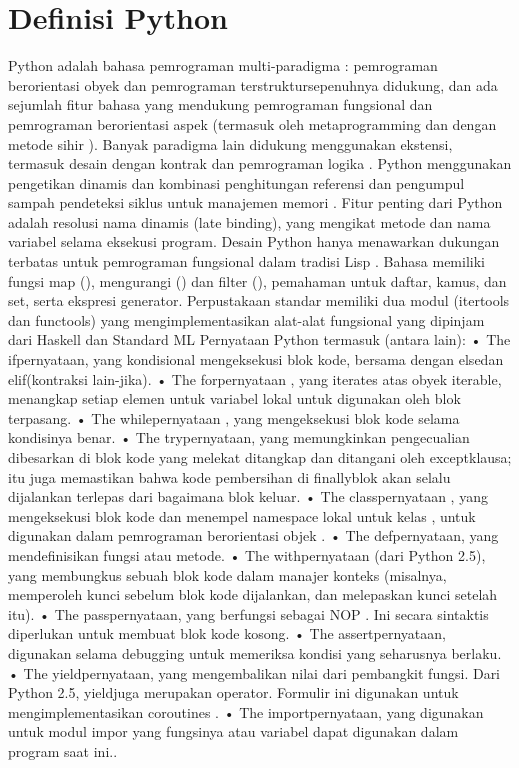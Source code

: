 \section{Definisi Python}
Python adalah bahasa pemrograman multi-paradigma : pemrograman berorientasi obyek dan pemrograman terstruktursepenuhnya didukung, dan ada sejumlah fitur bahasa yang mendukung pemrograman fungsional dan pemrograman berorientasi aspek (termasuk oleh metaprogramming dan dengan metode sihir ).  Banyak paradigma lain didukung menggunakan ekstensi, termasuk desain dengan kontrak  dan pemrograman logika .
Python menggunakan pengetikan dinamis dan kombinasi penghitungan referensi dan pengumpul sampah pendeteksi siklus untuk manajemen memori . Fitur penting dari Python adalah resolusi nama dinamis (late binding), yang mengikat metode dan nama variabel selama eksekusi program.
Desain Python hanya menawarkan dukungan terbatas untuk pemrograman fungsional dalam tradisi Lisp . Bahasa memiliki fungsi map (), mengurangi () dan filter (), pemahaman untuk daftar, kamus, dan set, serta ekspresi generator. Perpustakaan standar memiliki dua modul (itertools dan functools) yang mengimplementasikan alat-alat fungsional yang dipinjam dari Haskell dan Standard ML 
Pernyataan Python termasuk (antara lain):
•	The ifpernyataan, yang kondisional mengeksekusi blok kode, bersama dengan elsedan elif(kontraksi lain-jika).
•	The forpernyataan , yang iterates atas obyek iterable, menangkap setiap elemen untuk variabel lokal untuk digunakan oleh blok terpasang.
•	The whilepernyataan , yang mengeksekusi blok kode selama kondisinya benar.
•	The trypernyataan, yang memungkinkan pengecualian dibesarkan di blok kode yang melekat ditangkap dan ditangani oleh exceptklausa; itu juga memastikan bahwa kode pembersihan di finallyblok akan selalu dijalankan terlepas dari bagaimana blok keluar.
•	The classpernyataan , yang mengeksekusi blok kode dan menempel namespace lokal untuk kelas , untuk digunakan dalam pemrograman berorientasi objek .
•	The defpernyataan, yang mendefinisikan fungsi atau metode.
•	The withpernyataan (dari Python 2.5), yang membungkus sebuah blok kode dalam manajer konteks (misalnya, memperoleh kunci sebelum blok kode dijalankan, dan melepaskan kunci setelah itu).
•	The passpernyataan, yang berfungsi sebagai NOP . Ini secara sintaktis diperlukan untuk membuat blok kode kosong.
•	The assertpernyataan, digunakan selama debugging untuk memeriksa kondisi yang seharusnya berlaku.
•	The yieldpernyataan, yang mengembalikan nilai dari pembangkit fungsi. Dari Python 2.5, yieldjuga merupakan operator. Formulir ini digunakan untuk mengimplementasikan coroutines .
•	The importpernyataan, yang digunakan untuk modul impor yang fungsinya atau variabel dapat digunakan dalam program saat ini.\cite{van2007python}.

